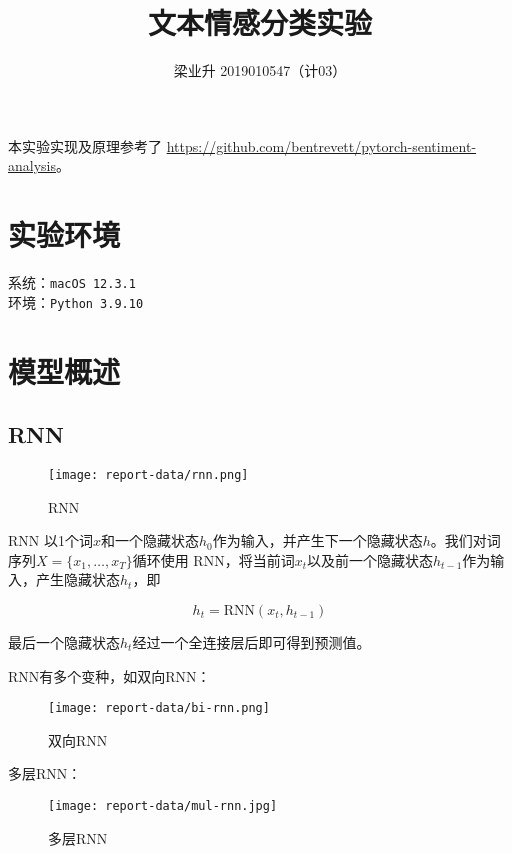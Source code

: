 \documentclass[a4paper]{article}
\begin{document}
\title{文本情感分类实验}
\author{梁业升 2019010547（计03）}

\maketitle

本实验实现及原理参考了 \url{https://github.com/bentrevett/pytorch-sentiment-analysis}。

\section*{实验环境}

系统：\texttt{macOS 12.3.1}\\
环境：\texttt{Python 3.9.10}

\section{模型概述}

\subsection{RNN}

\begin{figure}[H]
    \centering
    \texttt{[image: report-data/rnn.png]}
    \caption{RNN}
\end{figure}

RNN 以1个词$x$和一个隐藏状态$h_0$作为输入，并产生下一个隐藏状态$h$。我们对词序列$X=\{x_1,\ldots,x_T\}$循环使用 RNN，将当前词$x_t$以及前一个隐藏状态$h_{t-1}$作为输入，产生隐藏状态$h_t$，即

\begin{equation}
    h_t=\textrm{RNN}(x_t,h_{t-1})
\end{equation}

最后一个隐藏状态$h_t$经过一个全连接层后即可得到预测值。

RNN有多个变种，如双向RNN：

\begin{figure}[H]
    \centering
    \texttt{[image: report-data/bi-rnn.png]}
    \caption{双向RNN}
\end{figure}

多层RNN：

\begin{figure}[H]
    \centering
    \texttt{[image: report-data/mul-rnn.jpg]}
    \caption{多层RNN}
\end{figure}
\end{document}
